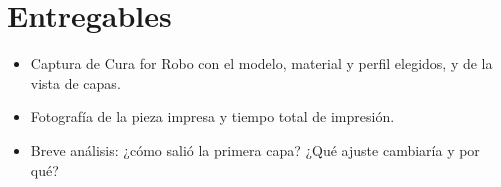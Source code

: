\section{Entregables}

\begin{entregabox}
\begin{itemize}
    \item Captura de Cura for Robo con el modelo, material y perfil elegidos, y de la vista de capas.
    \item Fotografía de la pieza impresa y tiempo total de impresión.
    \item Breve análisis: ¿cómo salió la primera capa? ¿Qué ajuste cambiaría y por qué?
\end{itemize}
\end{entregabox}
